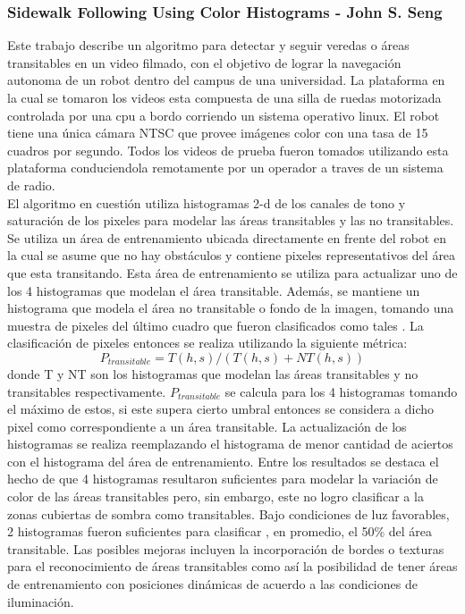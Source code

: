 	\subsubsection{\label{sec:sidewalk} Sidewalk Following Using Color Histograms - John S. Seng}
	Este trabajo describe un algoritmo  para detectar y seguir 
	veredas o áreas transitables en un video filmado, con el objetivo de 
	lograr la navegación autonoma de un robot dentro del 
	campus de una universidad. La plataforma en la cual se tomaron los videos esta 
	compuesta de una silla de ruedas motorizada controlada por una cpu 
	a bordo corriendo un sistema operativo linux. El robot tiene una 
	única cámara NTSC que provee imágenes color con una tasa de 15 
	cuadros por segundo. Todos los videos de prueba fueron tomados 
	utilizando esta plataforma conduciendola remotamente por un 
	operador a traves de un sistema de radio.\\
	\indent El algoritmo en cuestión utiliza histogramas 2-d de los 
	canales de tono y saturación de los pixeles para modelar las áreas
	transitables y las no transitables. Se utiliza un área de 
	entrenamiento ubicada directamente en frente del robot en la cual se asume que 
	no hay obstáculos y contiene pixeles representativos del área que 
	esta transitando. Esta área de entrenamiento se utiliza para 
	actualizar uno de los 4 histogramas que modelan el área 
	transitable. Además, se mantiene un histograma que modela el
	área no transitable o fondo de la imagen, tomando una muestra de pixeles del último 
	cuadro que fueron clasificados como tales . La 
	clasificación de pixeles entonces se realiza utilizando la 
	siguiente métrica:
	\[
	P_{transitable}= T(h,s)/ ( T(h,s) + NT(h,s))
	\]
	donde T y NT son los histogramas que modelan las áreas transitables
	y no transitables respectivamente. $P_{transitable}$ se calcula para 
	los 4 histogramas tomando el máximo de estos, si este supera 
	cierto umbral entonces se considera a dicho pixel como 
	correspondiente a un área transitable.
	La actualización de los histogramas se realiza reemplazando el 
	histograma de menor cantidad de aciertos con el histograma 
	del área de entrenamiento.  Entre los resultados se destaca el 
	hecho de que 4 histogramas resultaron suficientes para modelar la
	variación de color de las áreas transitables pero, sin embargo, este no 
	logro clasificar a la zonas cubiertas de sombra como transitables.
	Bajo condiciones de luz favorables, 2 histogramas fueron 
	suficientes para clasificar , en promedio, el 50\% del área 
	transitable. Las posibles mejoras incluyen la incorporación de 
	bordes o texturas para el reconocimiento de áreas transitables 
	como así la posibilidad de tener áreas de entrenamiento con 
	posiciones dinámicas de acuerdo a las condiciones de iluminación.
	
